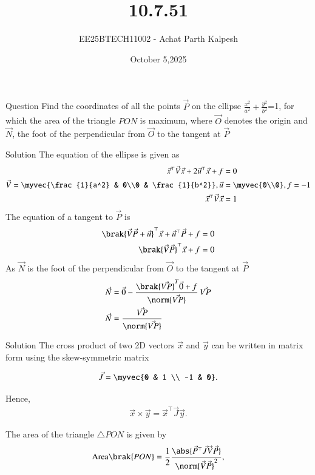 \documentclass{beamer}
\title %
{10.7.51}
\date{October 5,2025}
\author %
{EE25BTECH11002 - Achat Parth Kalpesh}
\begin{document}
\frame{\titlepage}

\begin{frame}{Question}
Find the coordinates of all the points $\vec{P}$ on the ellipse $\frac{x^2}{a^2}+\frac{y^2}{b^2}$=1, for which the area of the triangle $PON$ is maximum, where $\vec{O}$ denotes the origin and $\vec{N}$, the foot of the perpendicular from $\vec{O}$ to the tangent at $\vec{P}$
\end{frame}

\begin{frame}{Solution}
The equation of the ellipse is given as
\begin{align}
\vec{x}^\top\vec{V}\vec{x} + 2\vec{u}^\top\vec{x} + f &= 0\\
\vec{V} = \myvec{\frac{1}{a^2} & 0\\0 & \frac{1}{b^2}},\vec{u} &= \myvec{0\\0} , f = -1\\
\vec{x}^\top\vec{V} \vec{x} &= 1
\end{align}
The equation of a tangent to $\vec{P}$ is 
\begin{align}
    \brak{\vec{V}\vec{P} + \vec{u}}^\top \vec{x} + \vec{u}^\top\vec{P} + f = 0\\
    \brak{\vec{V}\vec{P}}^\top\vec{x} + f = 0
\end{align}
As $\vec{N}$ is the foot of the perpendicular from $\vec{O}$ to the tangent at $\vec{P}$
    \begin{align}
    \vec{N} &= \vec{0} - \frac{\brak{\vec{VP}}^T \vec{0} + f}{\norm{\vec{VP}}} \, \vec{VP}\\
    \vec{N} &= \frac{\vec{VP}}{\norm{\vec{VP}}}
\end{align} 
\end{frame}



\begin{frame}{Solution}
The cross product of two 2D vectors $\vec{x}$ and 
$\vec{y}$  can be written in matrix form using the skew-symmetric matrix

\begin{align}
    \vec{J} = \myvec{0 & 1 \\ -1 & 0}.
\end{align}

Hence,
\begin{align}
    \vec{x} \times \vec{y} = \vec{x}^\top \vec{J} \vec{y}.
\end{align}

The area of the triangle $\triangle PON$ is given by
\begin{align}
    \text{Area}\brak{PON}
    = \frac{1}{2} \frac{\abs{\vec{P}^\top \vec{J} \vec{V} \vec{P}}}{\norm{\vec{V}\vec{P}}^2},
\end{align}
\end{frame}
\end{document}
